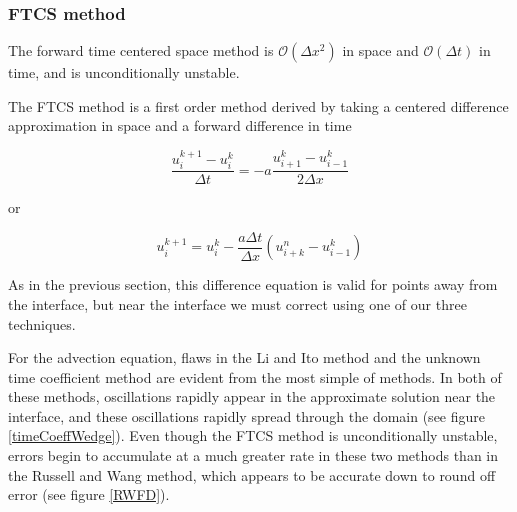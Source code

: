 \subsubsection{FTCS method}

The forward time centered space method is $\mathcal{O}(\Delta x^2)$ in space and $\mathcal{O}(\Delta t)$ in time, and is unconditionally unstable.

The FTCS method is a first order method derived by taking a centered difference approximation in space and a forward difference in time

\begin{equation}
    \frac{u_i^{k+1} - u_i^k}{\Delta t} = -a \frac{u_{i+1}^k - u_{i-1}^k}{2 \Delta x}
\end{equation}

or

\begin{equation}
    u_i^{k+1} = u_i^k - \frac{a \Delta t}{\Delta x}(u_{i+k}^n - u_{i-1}^k)
\end{equation}

As in the previous section, this difference equation is valid for points away from the interface, but near the interface we must correct using one of our three techniques.

For the advection equation, flaws in the Li and Ito method and the unknown time coefficient method are evident from the most simple of methods.
In both of these methods, oscillations rapidly appear in the approximate solution near the interface, and these oscillations rapidly spread through the domain (see figure \ref{timeCoeffWedge}).
Even though the FTCS method is unconditionally unstable, errors begin to accumulate at a much greater rate in these two methods than in the Russell and Wang method, which appears to be accurate down to round off error (see figure \ref{RWFD}).

